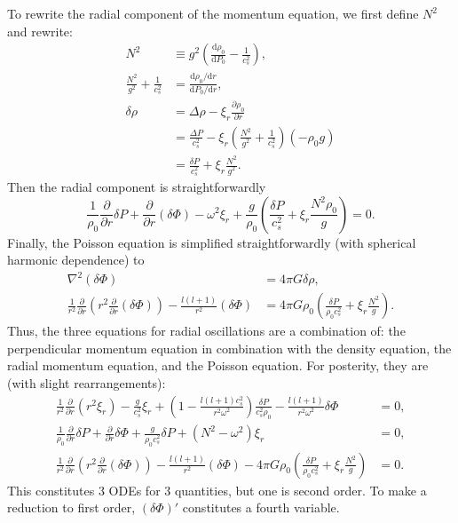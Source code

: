 \documentclass[11pt,
        usenames, %
        twocolumn,
        landscape,
        dvipsnames %
    ]{article}
\newcommand*{\rd}[2]{\frac{\mathrm{d}#1}{\mathrm{d}#2}}
\newcommand*{\pd}[2]{\frac{\partial#1}{\partial#2}}
\newcommand*{\rdil}[2]{\mathrm{d}#1 / \mathrm{d}#2}
\newcommand*{\p}[1]{\left(#1\right)}
\begin{document}
To rewrite the radial component of the momentum equation, we first define $N^2$
and rewrite:
\begin{align}
    N^2 &\equiv g^2\p{\rd{\rho_0}{P_0} - \frac{1}{c_s^2}},\\
    \frac{N^2}{g^2} + \frac{1}{c_s^2} &= \frac{\rdil{\rho_0}{r}}{
        \rdil{P_0}{r}},\nonumber\\
    \delta \rho&= \Delta \rho - \xi_r \pd{\rho_0}{r}\nonumber\\
        &= \frac{\Delta P}{c_s^2} - \xi_r\p{\frac{N^2}{g^2} + \frac{1}{c_s^2}}
            \p{-\rho_0 g}\nonumber\\
        &= \frac{\delta P}{c_s^2} + \xi_r \frac{N^2}{g^2}.
\end{align}
Then the radial component is straightforwardly
\begin{equation}
    \frac{1}{\rho_0}\pd{}{r}\delta P
        + \pd{}{r}\p{\delta \Phi}
        - \omega^2\xi_r
        + \frac{g}{\rho_0}\p{\frac{\delta P}{c_s^2} + \xi_r \frac{N^2\rho_0}{g}}
        = 0.
\end{equation}
Finally, the Poisson equation is simplified straightforwardly (with spherical
harmonic dependence) to
\begin{align}
    \nabla^2\p{\delta \Phi} &= 4\pi G \delta \rho,\nonumber\\
    \frac{1}{r^2}\pd{}{r}\p{r^2\pd{}{r}(\delta \Phi)}
        - \frac{l(l + 1)}{r^2}(\delta \Phi)
        &= 4\pi G \rho_0\p{\frac{\delta P}{\rho_0 c_s^2}
            + \xi_r\frac{N^2}{g}}.
\end{align}
Thus, the three equations for radial oscillations are a combination of: the
perpendicular momentum equation in combination with the density equation, the
radial momentum equation, and the Poisson equation. For posterity, they are
(with slight rearrangements):
\begin{align}
    \frac{1}{r^2}\pd{}{r}\p{r^2\xi_r}
            - \frac{g}{c_s^2}\xi_r
            + \p{1 - \frac{l(l + 1)c_s^2}{r^2\omega^2}}
                \frac{\delta P}{c_s^2\rho_0}
            - \frac{l(l + 1)}{r^2\omega^2}\delta \Phi
        &= 0,\label{eq:pert_dim1}\\
    \frac{1}{\rho_0}\pd{}{r}\delta P
        + \pd{}{r}\delta \Phi
        + \frac{g}{\rho_0c_s^2}\delta P
        + \p{N^2 - \omega^2}\xi_r
        &= 0,\label{eq:pert_dim2}\\
    \frac{1}{r^2}\pd{}{r}\p{r^2\pd{}{r}(\delta \Phi)}
        - \frac{l(l + 1)}{r^2}(\delta \Phi)
        - 4\pi G \rho_0
            \p{\frac{\delta P}{\rho_0 c_s^2} + \xi_r\frac{N^2}{g}} &= 0.
            \label{eq:pert_dim3}
\end{align}
This constitutes 3 ODEs for 3 quantities, but one is second order. To make a
reduction to first order, $\p{\delta \Phi}'$ constitutes a fourth variable.
\end{document}
